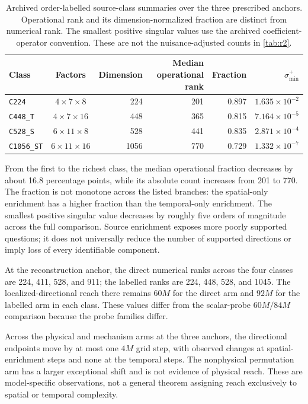 \begin{table}[htbp]
\centering\small
\caption{Archived order-labelled source-class summaries over the three prescribed anchors. Operational rank and its dimension-normalized fraction are distinct from numerical rank. The smallest positive singular values use the archived coefficient-operator convention. These are not the nuisance-adjusted counts in \cref{tab:r2}.}
\label{tab:enrichment}
\begin{tabular}{l c r r r r}
\toprule
Class&Factors&Dimension&Median operational rank&Fraction&$\sigma_{\min}^{+}$\\
\midrule
\texttt{C224}&$4\times7\times8$&224&201&0.897&$1.635\times10^{-2}$\\
\texttt{C448\_T}&$4\times7\times16$&448&365&0.815&$7.164\times10^{-5}$\\
\texttt{C528\_S}&$6\times11\times8$&528&441&0.835&$2.871\times10^{-4}$\\
\texttt{C1056\_ST}&$6\times11\times16$&1056&770&0.729&$1.332\times10^{-7}$\\
\bottomrule
\end{tabular}
\end{table}

From the first to the richest class, the median operational fraction decreases by about 16.8 percentage points, while its absolute count increases from 201 to 770. The fraction is not monotone across the listed branches: the spatial-only enrichment has a higher fraction than the temporal-only enrichment. The smallest positive singular value decreases by roughly five orders of magnitude across the full comparison. Source enrichment exposes more poorly supported questions; it does not universally reduce the number of supported directions or imply loss of every identifiable component.

At the reconstruction anchor, the direct numerical ranks across the four classes are 224, 411, 528, and 911; the labelled ranks are 224, 448, 528, and 1045. The localized-directional reach there remains $60M$ for the direct arm and $92M$ for the labelled arm in each class. These values differ from the scalar-probe $60M/84M$ comparison because the probe families differ.

Across the physical and mechanism arms at the three anchors, the directional endpoints move by at most one $4M$ grid step, with observed changes at spatial-enrichment steps and none at the temporal steps. The nonphysical permutation arm has a larger exceptional shift and is not evidence of physical reach. These are model-specific observations, not a general theorem assigning reach exclusively to spatial or temporal complexity.

